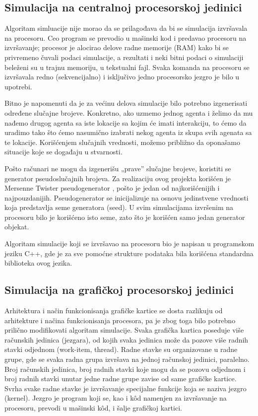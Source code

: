 \subsection{Simulacija na centralnoj procesorskoj jedinici}

Algoritam simluacije nije morao da se prilagođava da bi se simulacija izvršavala na procesoru. Ceo program se prevodio u mašinski kod i predavao procesoru na izvršavanje; procesor je alocirao delove radne memorije (RAM) kako bi se privremeno čuvali podaci simulacije, a rezultati i neki bitni podaci o simulaciji beleženi su u trajnu memoriju, u tekstualni fajl. Svaka komanda na procesoru se izvršavala redno (sekvencijalno) i isključivo jedno procesorsko jezgro je bilo u upotrebi.

Bitno je napomenuti da je za većinu delova simulacije bilo potrebno izgenerisati određene slučajne brojeve. Konkretno, ako uzmemo jednog agenta i želimo da mu nađemo drugog agenta sa iste lokacije sa kojim će imati interakciju, to ćemo da uradimo tako što ćemo nasumično izabrati nekog agenta iz skupa svih agenata sa te lokacije. Korišćenjem slučajnih vrednosti, možemo približno da oponašamo situacije koje se događaju u stvarnosti.

Pošto računari ne mogu da izgenerišu „prave” slučajne brojeve, koristiti se generator pseudoslučajnih brojeva. Za realizaciju ovog projekta korišćen je Mersenne Twister pseudogenerator \parencite{matsumoto1998}, pošto je jedan od najkorišćenijih i najpouzdanijih. Pseudogenerator se inicijalizuje na osnovu jedinstvene vrednosti koja predstavlja seme generatora (seed). U svim simulacijama izvršenim na procesoru bilo je korišćeno isto seme, zato što je korišćen samo jedan generator objekat.

Algoritam simulacije koji se izvršavao na procesoru bio je napisan u programskom jeziku C++, gde je za sve pomoćne strukture podataka bila korišćena standardna biblioteka ovog jezika.

\subsection{Simulacija na grafičkoj procesorskoj jedinici}

Arhitektura i način funkcionisanja grafičke kartice se dosta razlikuju od arhitekture i načina funkcionisanja procesora, pa je zbog toga bilo potrebno prilično modifikovati algoritam simulacije. Svaka grafička kartica poseduje više računskih jedinica (jezgara), od kojih svaka jedinica može da pozove više radnih stavki odjednom (work-item, thread). Radne stavke su organizovane u radne grupe, gde se svaka radna grupa izvršava na jednoj računskoj jedinici, paralelno. Broj računskih jedinica, broj radnih stavki koje mogu da se pozovu odjednom i broj radnih stavki unutar jedne radne grupe zavise od same grafičke kartice. Svrha svake radne stavke je izvršavanje specijalne funkcije koja se naziva jezgro (kernel). Jezgro je program koji se, kao i kôd namenjen za izvršavanje na procesoru, prevodi u mašinski kôd, i šalje grafičkoj kartici.

